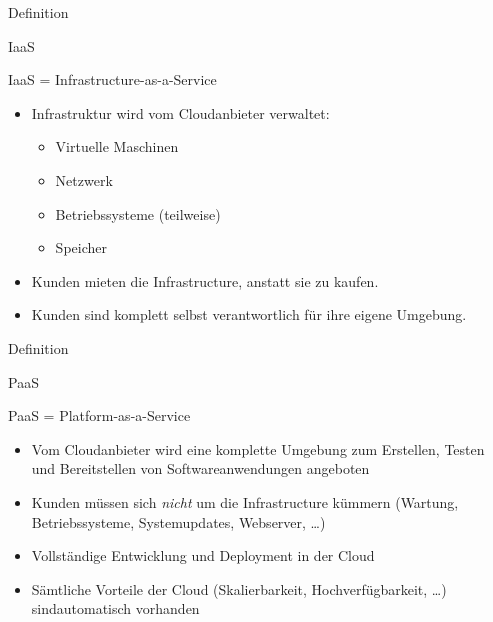 \documentclass{scrartcl}
\newenvironment{flashcard}[2][]{%
    #1
    \vfill
    \centerline{\Large{#2}}
    \vfill
\newpage
}
{\newpage}
\begin{document}
    \begin{flashcard}[Definition]{IaaS}
        IaaS = Infrastructure-as-a-Service

        \begin{itemize}
            \item Infrastruktur wird vom Cloudanbieter verwaltet:
            \begin{itemize}
                \item Virtuelle Maschinen
                \item Netzwerk
                \item Betriebssysteme (teilweise)
                \item Speicher
            \end{itemize}
            \item Kunden mieten die Infrastructure, anstatt sie zu kaufen.
            \item Kunden sind komplett selbst verantwortlich für ihre eigene Umgebung.
        \end{itemize}
    \end{flashcard}

    \begin{flashcard}[Definition]{PaaS}
        PaaS = Platform-as-a-Service

        \begin{itemize}
            \item Vom Cloudanbieter wird eine komplette Umgebung zum Erstellen, Testen und Bereitstellen von Softwareanwendungen angeboten
            \item Kunden müssen sich \emph{nicht} um die Infrastructure kümmern\newline
            (Wartung, Betriebssysteme, Systemupdates, Webserver, \ldots)
            \item Vollständige Entwicklung und Deployment in der Cloud
            \item Sämtliche Vorteile der Cloud (Skalierbarkeit, Hochverfügbarkeit, \ldots) sind\newline automatisch vorhanden
        \end{itemize}
    \end{flashcard}
\end{document}
